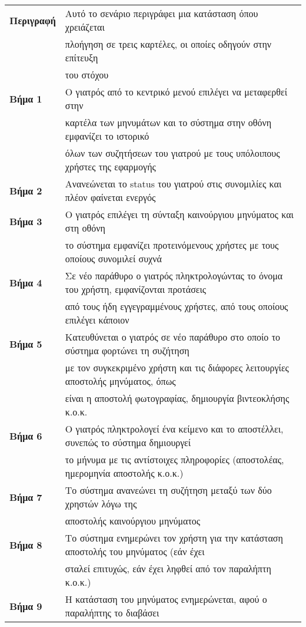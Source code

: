\documentclass{article}
\newcommand\T{\rule{0pt}{2.6ex}}       %
\newcommand\B{\rule[-1.2ex]{0pt}{0pt}}
\begin{document}
 \begin{center}
     \begin{tabular}{|l|l|}
     \hline
      \textbf{Περιγραφή} & Αυτό το σενάριο περιγράφει μια κατάσταση όπου χρειάζεται \T \\& πλοήγηση σε τρεις καρτέλες, οι οποίες οδηγούν στην επίτευξη \\& του στόχου \B \\ 
      \hline
      \textbf{Βήμα 1} & Ο γιατρός από το κεντρικό μενού επιλέγει να μεταφερθεί στην \T \\& καρτέλα των μηνυμάτων και το σύστημα στην οθόνη εμφανίζει το ιστορικό \\& όλων των συζητήσεων του γιατρού με τους υπόλοιπους χρήστες της εφαρμογής \B \\
      \hline
      \textbf{Βήμα 2} & Ανανεώνεται το status του γιατρού στις συνομιλίες και πλέον φαίνεται ενεργός \T\B \\
      \hline
      \textbf{Βήμα 3} & Ο γιατρός επιλέγει τη σύνταξη καινούργιου μηνύματος και στη οθόνη \T \\& το σύστημα εμφανίζει προτεινόμενους χρήστες με τους οποίους συνομιλεί συχνά \B \\
      \hline
      \textbf{Βήμα 4} & Σε νέο παράθυρο ο γιατρός πληκτρολογώντας το όνομα του χρήστη, εμφανίζονται προτάσεις \T \\& από τους ήδη εγγεγραμμένους χρήστες, από τους οποίους επιλέγει κάποιον  \B \\
      \hline
      \textbf{Βήμα 5} & Κατευθύνεται ο γιατρός σε νέο παράθυρο στο οποίο το σύστημα φορτώνει τη συζήτηση \T \\& με τον  συγκεκριμένο χρήστη και τις διάφορες λειτουργίες αποστολής μηνύματος, όπως \\& είναι η αποστολή φωτογραφίας, δημιουργία βιντεοκλήσης κ.ο.κ.  \B \\
      \hline
      \textbf{Βήμα 6} & Ο γιατρός πληκτρολογεί ένα κείμενο και το αποστέλλει, συνεπώς το σύστημα δημιουργεί \T \\& το  μήνυμα με τις αντίστοιχες πληροφορίες (αποστολέας, ημερομηνία αποστολής κ.ο.κ.) \B \\
      \hline
      \textbf{Βήμα 7} & Το σύστημα ανανεώνει τη συζήτηση μεταξύ των δύο χρηστών λόγω της \T \\& αποστολής καινούργιου μηνύματος \B \\
      \hline
      \textbf{Βήμα 8} & Το σύστημα ενημερώνει τον χρήστη για την κατάσταση αποστολής του μηνύματος (εάν έχει \T \\& σταλεί επιτυχώς, εάν έχει ληφθεί από τον παραλήπτη κ.ο.κ.) \B \\
      \hline
      \textbf{Βήμα 9} & Η κατάσταση του μηνύματος ενημερώνεται, αφού ο παραλήπτης το διαβάσει \T\B \\
      \hline
     \end{tabular}
 \end{center}
 
\end{document}
